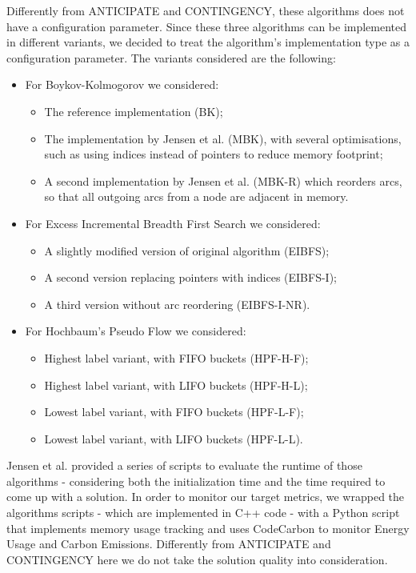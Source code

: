 \documentclass[a4paper,singleside,12pt]{report} %
\begin{document}
Differently from ANTICIPATE and CONTINGENCY, these algorithms does not have a configuration parameter. Since these three algorithms can 
be implemented in different variants, we decided to treat the algorithm's implementation type as a configuration parameter. The variants considered
are the following:

\begin{itemize}
    \item For Boykov-Kolmogorov we considered:
    \begin{itemize}
        \item The reference implementation (BK);
        \item The implementation by Jensen et al. (MBK), with several optimisations, such as using indices instead of pointers to reduce memory footprint;
        \item A second implementation by Jensen et al. (MBK-R) which reorders arcs, so that all outgoing arcs from a node are adjacent in memory.
    \end{itemize}
    \item For Excess Incremental Breadth First Search we considered:
    \begin{itemize}
        \item A slightly modified version of original algorithm (EIBFS);
        \item A second version replacing pointers with indices (EIBFS-I);
        \item A third version without arc reordering (EIBFS-I-NR).
    \end{itemize}
    \item For Hochbaum's Pseudo Flow we considered:
    \begin{itemize}
        \item Highest label variant, with FIFO buckets (HPF-H-F);
        \item Highest label variant, with LIFO buckets (HPF-H-L);
        \item Lowest label variant, with FIFO buckets (HPF-L-F);
        \item Lowest label variant, with LIFO buckets (HPF-L-L).
    \end{itemize}
\end{itemize}

Jensen et al. provided a series of scripts to evaluate the runtime of those algorithms - considering both the initialization time and the time required
to come up with a solution. In order to monitor our target metrics, we wrapped the algorithms scripts - which are implemented in C++ code - with a Python
script that implements memory usage tracking and uses CodeCarbon to monitor Energy Usage and Carbon Emissions. Differently from ANTICIPATE and CONTINGENCY
here we do not take the solution quality into consideration.
\end{document}
